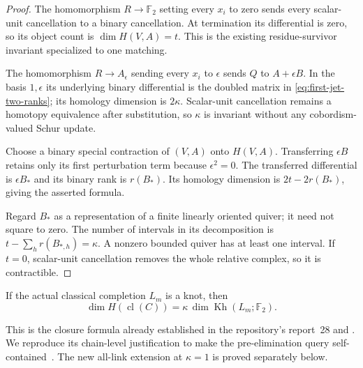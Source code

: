 \begin{proof}
The homomorphism $R\to\mathbb F_2$ setting every $x_i$ to zero sends
every scalar-unit cancellation to a binary cancellation. At termination
its differential is zero, so its object count is $\dim H(V,A)=t$.
This is the existing residue-survivor invariant specialized to one matching.

The homomorphism $R\to A_\epsilon$ sending every $x_i$ to $\epsilon$
sends $Q$ to $A+\epsilon B$. In the basis $1,\epsilon$ its underlying
binary differential is the doubled matrix in
\eqref{eq:first-jet-two-ranks}; its homology dimension is $2\kappa$.
Scalar-unit cancellation remains a homotopy equivalence after substitution,
so $\kappa$ is invariant without any cobordism-valued Schur update.

Choose a binary special contraction of $(V,A)$ onto $H(V,A)$. Transferring
$\epsilon B$ retains only its first perturbation term because
$\epsilon^2=0$. The transferred differential is $\epsilon B_*$ and its
binary rank is $r(B_*)$. Its homology dimension is $2t-2r(B_*)$, giving
the asserted formula.

Regard $B_*$ as a representation of a finite linearly oriented quiver;
it need not square to zero. The number of intervals in its decomposition
is $t-\sum_h r(B_{*,h})=\kappa$. A nonzero bounded quiver has at least
one interval. If $t=0$, scalar-unit cancellation removes the whole
relative complex, so it is contractible.
\end{proof}

\begin{lemma}
\label{lem:first-jet-knot-multiplier}
If the actual classical completion $L_m$ is a knot, then
\begin{equation}
 \dim H(\operatorname{cl}(C))
 =\kappa\,\dim\operatorname{Kh}(L_m;\mathbb F_2).
 \label{eq:first-jet-knot-multiplier}
\end{equation}
\end{lemma}

This is the closure formula already established in the repository's
report~28 and . We reproduce its
chain-level justification to make the pre-elimination query self-contained~\cite{ClosurePrior}.
The new all-link extension at $\kappa=1$ is proved separately below.

